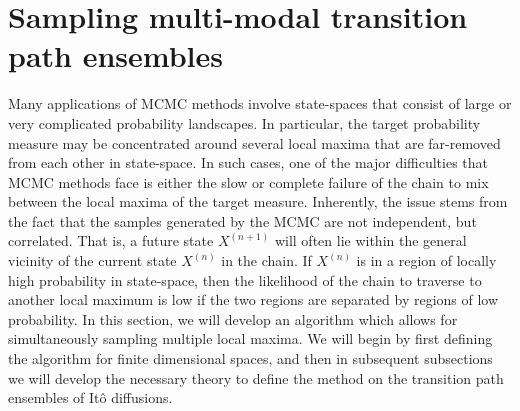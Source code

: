 

\section{Sampling multi-modal transition path ensembles} \label{sec:Teleporter MCMC}

Many applications of MCMC methods involve state-spaces that consist of large or very complicated probability landscapes. In particular, the target probability measure may be concentrated around several local maxima that are far-removed from each other in state-space. In such cases, one of the major difficulties that MCMC methods face is either the slow or complete failure of the chain to mix between the local maxima of the target measure. Inherently, the issue stems from the fact that the samples generated by the MCMC are not independent, but correlated. That is, a future state $X^{(n+1)}$ will often lie within the general vicinity of the current state $X^{(n)}$ in the chain. If $X^{(n)}$ is in a region of locally high probability in state-space, then the likelihood of the chain to traverse to another local maximum is low if the two regions are separated by regions of low probability. In this section, we will develop an algorithm which allows for simultaneously sampling multiple local maxima. We will begin by first defining the algorithm for finite dimensional spaces, and then in subsequent subsections we will develop the necessary theory to define the method on the transition path ensembles of It\^{o} diffusions.

